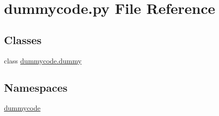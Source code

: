 \section{dummycode.\-py File Reference}
\label{dummycode_8py}
\subsection*{Classes}
\begin{DoxyCompactItemize}
\item 
class \hyperlink{classdummycode_1_1dummy}{dummycode.\-dummy}
\end{DoxyCompactItemize}
\subsection*{Namespaces}
\begin{DoxyCompactItemize}
\item 
\hyperlink{namespacedummycode}{dummycode}
\end{DoxyCompactItemize}

